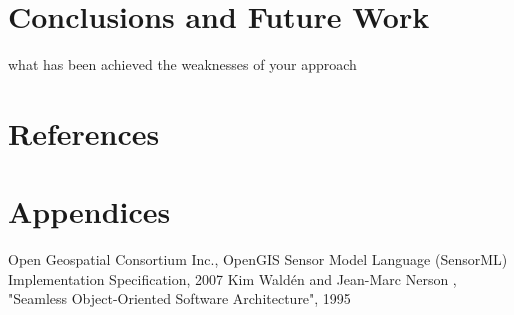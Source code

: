 \documentclass[]{final_report}
\begin{document}
\chapter{ Conclusions and Future Work}

what has been achieved
the weaknesses of your approach

\chapter{References}



\chapter{Appendices}


\newpage
\begin{thebibliography}{99}
Open Geospatial Consortium Inc., OpenGIS Sensor Model Language (SensorML) Implementation Specification, 2007
Kim Waldén and Jean-Marc Nerson , "Seamless Object-Oriented Software Architecture", 1995
\end{thebibliography}
\label{endpage}
\end{document}
